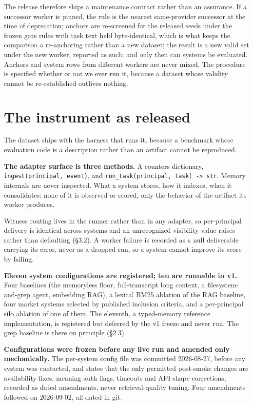 \documentclass[11pt]{article}
\newcommand{\code}[1]{\texttt{\small #1}}
\begin{document}
The release therefore ships a maintenance contract rather than an assurance. If a
successor worker is pinned, the rule is the nearest same-provider successor at the
time of deprecation; anchors are re-screened for the released seeds under the
frozen gate rules with task text held byte-identical, which is what keeps the
comparison a re-anchoring rather than a new dataset; the result is a new valid set
under the new worker, reported as such; and only then can systems be evaluated.
Anchors and system rows from different workers are never mixed. The procedure is
specified whether or not we ever run it, because a dataset whose validity cannot
be re-established outlives nothing.

\section{The instrument as released}

The dataset ships with the harness that runs it, because a benchmark whose
evaluation code is a description rather than an artifact cannot be reproduced.

\textbf{The adapter surface is three methods.} A counters dictionary,
\code{ingest(principal, event)}, and \code{run\_task(principal, task) -> str}. Memory internals are never inspected.
What a system stores, how it indexes, when it consolidates: none of it is
observed or scored, only the behavior of the artifact its worker produces.

Witness routing lives in the runner rather than in any adapter, so per-principal
delivery is identical across systems and an unrecognized visibility value raises
rather than defaulting (\S3.2). A worker failure is recorded as a null
deliverable carrying its error, never as a dropped run, so a system cannot
improve its score by failing.

\textbf{Eleven system configurations are registered; ten are runnable in v1.}
Four baselines (the memoryless floor, full-transcript long context, a
filesystem-and-grep agent, embedding RAG), a lexical BM25 ablation of the RAG
baseline, four market systems selected by published inclusion criteria, and a
per-principal silo ablation of one of them. The eleventh, a typed-memory
reference implementation, is registered but deferred by the v1 freeze and never
run. The grep baseline is there on principle (\S2.3).

\textbf{Configurations were frozen before any live run and amended only
mechanically.} The per-system config file was committed 2026-08-27, before any
system was contacted, and states that the only permitted post-smoke changes are
availability fixes, meaning auth flags, timeouts and API-shape corrections,
recorded as dated amendments, never retrieval-quality tuning. Four amendments
followed on 2026-09-02, all dated in git.
\end{document}
